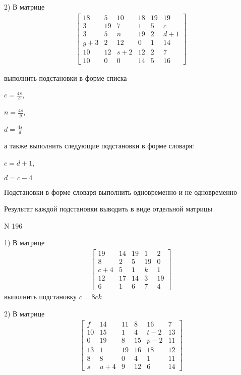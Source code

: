 \documentclass[11pt]{report}
\begin{document}
    2) В матрице
\begin{align*}
\left[\begin{matrix}18 & 5 & 10 & 18 & 19 & 19\\3 & 19 & 7 & 1 & 5 & c\\3 & 5 & n & 19 & 2 & d + 1\\g + 3 & 2 & 12 & 0 & 1 & 14\\10 & 12 & s + 2 & 12 & 2 & 7\\10 & 0 & 0 & 14 & 5 & 16\end{matrix}\right]
\end{align*}

выполнить подстановки в форме списка

$c=\frac{4 s}{c}$,

$n=\frac{4 s}{g}$,

$d=\frac{4 s}{d}$

а также выполнить следующие подстановки в форме словаря:

$c=d + 1$,

$d=c - 4$


    Подстановки в форме словаря выполнить одновременно и не одновременно


    Результат каждой подстановки выводить в виде отдельной матрицы

\newpage
N 196


    1) В матрице
\begin{align*}
\left[\begin{matrix}19 & 14 & 19 & 1 & 2\\8 & 2 & 5 & 19 & 0\\c + 4 & 5 & 1 & k & 1\\12 & 17 & 14 & 3 & 19\\6 & 1 & 6 & 7 & 4\end{matrix}\right]
\end{align*}
выполнить подстановку $c=8 c k$


    2) В матрице
\begin{align*}
\left[\begin{matrix}f & 14 & 11 & 8 & 16 & 7\\10 & 15 & 1 & 4 & t - 2 & 13\\0 & 19 & 8 & 15 & p - 2 & 11\\13 & 1 & 19 & 16 & 18 & 12\\8 & 8 & 0 & 4 & 1 & 11\\s & u + 4 & 9 & 12 & 6 & 14\end{matrix}\right]
\end{align*}
\end{document}

